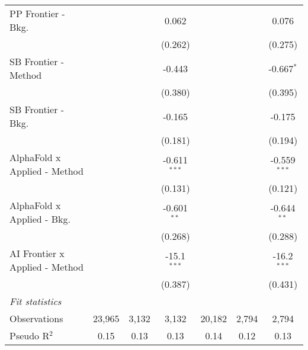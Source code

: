 \begin{tabular}{lcccccc}
   PP Frontier - Bkg.             &                &                & 0.062          &                &                & 0.076\\   
                                  &                &                & (0.262)        &                &                & (0.275)\\   
   SB Frontier - Method           &                &                & -0.443         &                &                & -0.667$^{*}$\\   
                                  &                &                & (0.380)        &                &                & (0.395)\\   
   SB Frontier - Bkg.             &                &                & -0.165         &                &                & -0.175\\   
                                  &                &                & (0.181)        &                &                & (0.194)\\   
   AlphaFold x Applied - Method   &                &                & -0.611$^{***}$ &                &                & -0.559$^{***}$\\   
                                  &                &                & (0.131)        &                &                & (0.121)\\   
   AlphaFold x Applied - Bkg.     &                &                & -0.601$^{**}$  &                &                & -0.644$^{**}$\\   
                                  &                &                & (0.268)        &                &                & (0.288)\\   
   AI Frontier x Applied - Method &                &                & -15.1$^{***}$  &                &                & -16.2$^{***}$\\   
                                  &                &                & (0.387)        &                &                & (0.431)\\   
   \midrule
   \emph{Fit statistics}\\
   Observations                   & 23,965         & 3,132          & 3,132          & 20,182         & 2,794          & 2,794\\  
   Pseudo R$^2$                   & 0.15           & 0.13           & 0.13           & 0.14           & 0.12           & 0.13\\  
   

\end{tabular}
